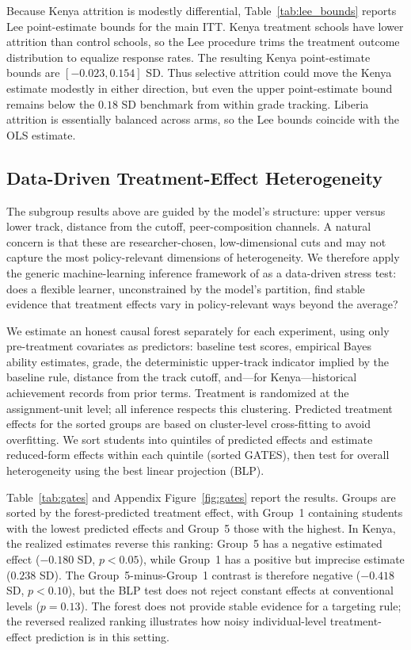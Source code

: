 \documentclass[11pt]{article}
\begin{document}
Because Kenya attrition is modestly differential, Table~\ref{tab:lee_bounds} reports Lee point-estimate bounds for the main ITT\@. Kenya treatment schools have lower attrition than control schools, so the Lee procedure trims the treatment outcome distribution to equalize response rates. The resulting Kenya point-estimate bounds are $[-0.023, 0.154]$ SD\@. Thus selective attrition could move the Kenya estimate modestly in either direction, but even the upper point-estimate bound remains below the $0.18$ SD benchmark from within grade tracking. Liberia attrition is essentially balanced across arms, so the Lee bounds coincide with the OLS estimate.

\subsection{Data-Driven Treatment-Effect Heterogeneity}

The subgroup results above are guided by the model's structure: upper versus lower track, distance from the cutoff, peer-composition channels. A natural concern is that these are researcher-chosen, low-dimensional cuts and may not capture the most policy-relevant dimensions of heterogeneity. We therefore apply the generic machine-learning inference framework of \citet{chernozhukov2025fisher} as a data-driven stress test: does a flexible learner, unconstrained by the model's partition, find stable evidence that treatment effects vary in policy-relevant ways beyond the average?

We estimate an honest causal forest \citep{wager_estimation_2018} separately for each experiment, using only pre-treatment covariates as predictors: baseline test scores, empirical Bayes ability estimates, grade, the deterministic upper-track indicator implied by the baseline rule, distance from the track cutoff, and---for Kenya---historical achievement records from prior terms. Treatment is randomized at the assignment-unit level; all inference respects this clustering. Predicted treatment effects for the sorted groups are based on cluster-level cross-fitting to avoid overfitting. We sort students into quintiles of predicted effects and estimate reduced-form effects within each quintile (sorted GATES), then test for overall heterogeneity using the best linear projection (BLP).

Table~\ref{tab:gates} and Appendix Figure~\ref{fig:gates} report the results. Groups are sorted by the forest-predicted treatment effect, with Group~1 containing students with the lowest predicted effects and Group~5 those with the highest. In Kenya, the realized estimates reverse this ranking: Group~5 has a negative estimated effect ($-0.180$ SD, $p < 0.05$), while Group~1 has a positive but imprecise estimate ($0.238$ SD). The Group~5-minus-Group~1 contrast is therefore negative ($-0.418$ SD, $p < 0.10$), but the BLP test does not reject constant effects at conventional levels ($p = 0.13$). The forest does not provide stable evidence for a targeting rule; the reversed realized ranking illustrates how noisy individual-level treatment-effect prediction is in this setting.
\end{document}
